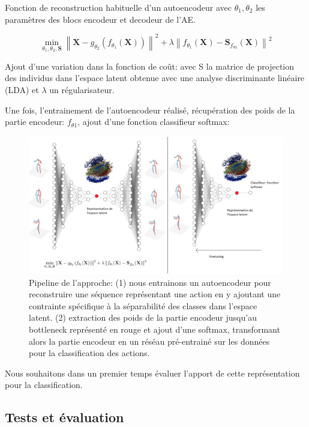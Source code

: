 Fonction de reconstruction habituelle d'un autoencodeur avec $\theta_{1}, \theta_{2}$ les paramètres des blocs encodeur et decodeur de l’AE. 

$$\min _{\theta_{1}, \theta_{2}, \mathbf{S}}\left\|\mathbf{X}-g_{\theta_{2}}\left(f_{\theta_{1}}(\mathbf{X})\right)\right\|^{2}+\lambda\left\|f_{\theta_{1}}(\mathbf{X})-\mathbf{S}_{f_{\theta 1}}(\mathbf{X})\right\|^{2}$$

Ajout d'une variation dans la fonction de coût: avec S la matrice de projection des individus dans l'espace latent obtenue avec une analyse discriminante linéaire (LDA) et $\lambda$ un régularisateur.

Une fois, l'entrainement de l'autoencodeur réalisé, récupération des poids de la partie encodeur: $f_{\theta 1}$, ajout d'une fonction classifieur softmax:\\ 


\begin{figure}[H]
    \includegraphics[width=1.1\linewidth]{Images/AE_supervis.png}
    \caption{Pipeline de l'approche: (1) nous entrainons un autoencodeur pour reconstruire une séquence représentant une action en y ajoutant une contrainte spécifique à la séparabilité des classes dans l'espace latent. (2) extraction des poids de la partie encodeur jusqu'au bottleneck représenté en rouge et ajout d'une softmax, transformant alors la partie encodeur en un réséau pré-entrainé sur les données pour la classification des actions.}
    \label{fig:AEmodif}
\end{figure}

Nous souhaitons dans un premier temps évaluer l'apport de cette représentation pour la classification.

\subsection{Tests et évaluation}

